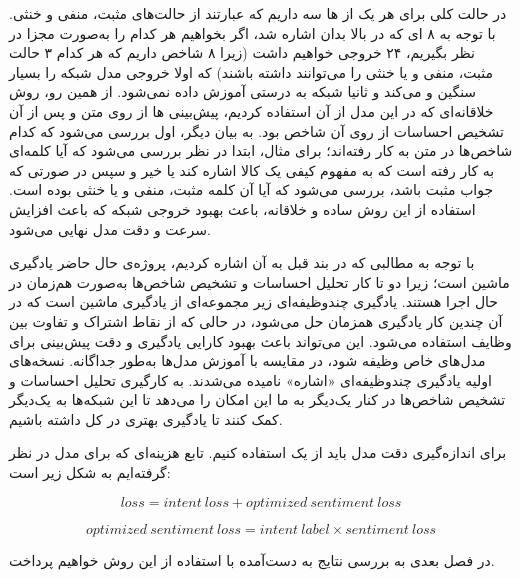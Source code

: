 در حالت کلی برای هر یک از 
ها 
سه
داریم که عبارتند از حالت‌های مثبت، منفی و خنثی. با توجه به ۸
ای که در بالا بدان اشاره شد، اگر بخواهیم هر کدام را به‌صورت مجزا در نظر بگیریم، ۲۴ خروجی خواهیم داشت (زیرا ۸ شاخص داریم که هر کدام ۳ حالت مثبت، منفی و یا خنثی را می‌توانند داشته باشند) که اولا خروجی مدل شبکه را بسیار سنگین و 
می‌کند و ثانیا شبکه به درستی آموزش داده نمی‌شود. از همین رو، روش خلاقانه‌ای که در این مدل از آن استفاده کردیم، پیش‌بینی 
ها از روی متن و پس از آن تشخیص احساسات از روی آن شاخص بود. 
 به بیان دیگر، اول بررسی می‌شود که کدام شاخص‌ها در متن به کار رفته‌اند؛ برای مثال، ابتدا در نظر بررسی می‌شود که آیا کلمه‌ای به کار رفته است که به مفهوم کیفی یک کالا اشاره کند یا خیر و سپس در صورتی که جواب مثبت باشد، بررسی می‌شود که آیا آن کلمه مثبت، منفی و یا خنثی بوده است. استفاده از این روش ساده و خلاقانه، باعث بهبود خروجی شبکه که باعث افزایش سرعت و دقت مدل نهایی می‌شود.

با توجه به مطالبی که در بند قبل به آن اشاره کردیم، پروژه‌ی حال حاضر 
یادگیری ماشین 
است؛ زیرا دو تا کار تحلیل احساسات و تشخیص شاخص‌ها به‌صورت هم‌زمان در حال اجرا هستند. یادگیری چندوظیفه‌ای زیر مجموعه‌ای از یادگیری ماشین است که در آن چندین کار یادگیری همزمان حل می‌شود، در حالی که از نقاط اشتراک و تفاوت بین وظایف استفاده می‌شود. این می‌تواند باعث بهبود کارایی یادگیری و دقت پیش‌بینی برای مدل‌های خاص وظیفه شود، در مقایسه با آموزش مدل‌ها به‌طور جداگانه. نسخه‌های اولیه یادگیری چندوظیفه‌ای «اشاره» نامیده می‌شدند.
\cite{wiki1}
\cite{wiki2}
\cite{wiki3}
به کارگیری تحلیل احساسات و تشخیص شاخص‌ها در کنار یک‌دیگر به ما این امکان را می‌دهد تا این شبکه‌ها به یک‌دیگر کمک کنند تا یادگیری بهتری در کل داشته باشیم.

برای اندازه‌گیری دقت مدل باید از یک 
استفاده کنیم. تابع هزینه‌ای که برای مدل در نظر گرفته‌ایم به شکل زیر است:

\begin{equation}
loss = intent \: loss + optimized \: sentiment \: loss
\end{equation}

\begin{equation}
optimized \: sentiment \:loss = intent \: label \times sentiment \: loss
\end{equation}

در فصل بعدی به بررسی نتایج به دست‌آمده با استفاده از این روش خواهیم پرداخت.